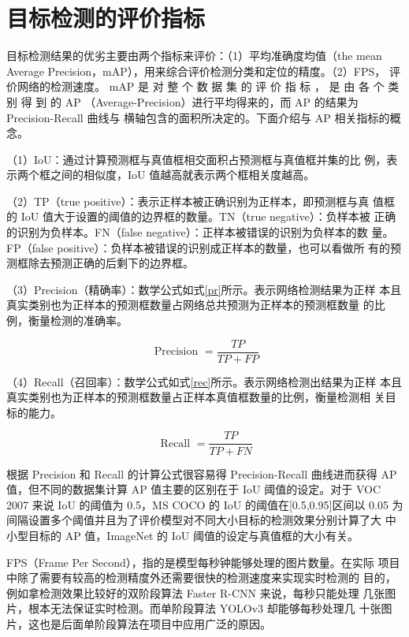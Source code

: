 \section{目标检测的评价指标}
目标检测结果的优劣主要由两个指标来评价：（1）平均准确度均值（the mean
Average Precision，mAP），用来综合评价检测分类和定位的精度。（2）FPS，
评价网络的检测速度。
mAP 是 对 整 个 数 据 集 的 评 价 指 标 ， 是 由 各 个 类 别 得 到 的 AP
（Average-Precision）进行平均得来的，而 AP 的结果为 Precision-Recall 曲线与
横轴包含的面积所决定的。下面介绍与 AP 相关指标的概念。

（1）IoU：通过计算预测框与真值框相交面积占预测框与真值框并集的比
例，表示两个框之间的相似度，IoU 值越高就表示两个框相关度越高。

（2）TP（true positive）：表示正样本被正确识别为正样本，即预测框与真
值框的 IoU 值大于设置的阈值的边界框的数量。TN（true negative）：负样本被
正确的识别为负样本。FN（false negative）：正样本被错误的识别为负样本的数
量。FP（false positive）：负样本被错误的识别成正样本的数量，也可以看做所
有的预测框除去预测正确的后剩下的边界框。

（3）Precision（精确率）：数学公式如式\ref{pr}所示。表示网络检测结果为正样
本且真实类别也为正样本的预测框数量占网络总共预测为正样本的预测框数量
的比例，衡量检测的准确率。

\begin{equation}
     \text { Precision }=\frac{T P}{T P+F P}
    \label{pr}
\end{equation}

（4）Recall（召回率）：数学公式如式\ref{rec}所示。表示网络检测出结果为正样
本且真实类别也为正样本的预测框数量占正样本真值框数量的比例，衡量检测相
关目标的能力。

\begin{equation}
     \text { Recall }=\frac{T P}{T P+F N}
    \label{rec}
\end{equation}

根据 Precision 和 Recall 的计算公式很容易得 Precision-Recall 曲线进而获得
AP 值，但不同的数据集计算 AP 值主要的区别在于 IoU 阈值的设定。对于 VOC
2007 来说 IoU 的阈值为 0.5，MS COCO 的 IoU 的阈值在[0.5,0.95]区间以 0.05 为
间隔设置多个阈值并且为了评价模型对不同大小目标的检测效果分别计算了大
中小型目标的 AP 值，ImageNet 的 IoU 阈值的设定与真值框的大小有关。

FPS（Frame Per Second），指的是模型每秒钟能够处理的图片数量。在实际
项目中除了需要有较高的检测精度外还需要很快的检测速度来实现实时检测的
目的，例如拿检测效果比较好的双阶段算法 Faster R-CNN 来说，每秒只能处理
几张图片，根本无法保证实时检测。而单阶段算法 YOLOv3 却能够每秒处理几
十张图片，这也是后面单阶段算法在项目中应用广泛的原因。

